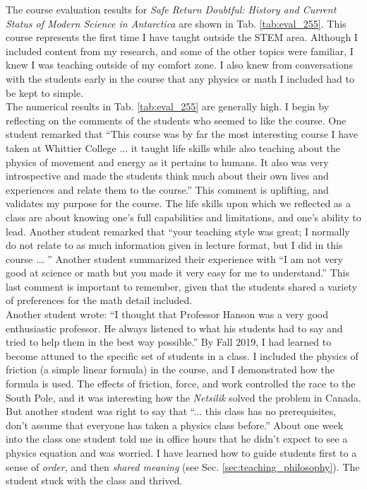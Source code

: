 \documentclass[../../../main.tex]{subfiles}
\begin{document}
The course evaluation results for \textit{Safe Return Doubtful: History and Current Status of Modern Science in Antarctica} are shown in Tab. \ref{tab:eval_255}.  This course represents the first time I have taught  outside the STEM area.  Although I included content from my research, and some of the other topics were familiar, I knew I was teaching outside of my comfort zone.  I also knew from conversations with the students early in the course that any physics or math I included had to be kept to simple.
\\
\vspace{0.25cm}
The numerical results in Tab. \ref{tab:eval_255} are generally high.  I begin by reflecting on the comments of the students who seemed to like the course.  One student remarked that ``This course was by far the most interesting course I have taken at Whittier College ... it taught life skills while also teaching about the physics of movement and energy as it pertains to humans.  It also was very introspective and made the students think much about their own lives and experiences and relate them to the course.''  This comment is uplifting, and validates my purpose for the course.  The life skills upon which we reflected as a class are about knowing one's full capabilities and limitations, and one's ability to lead.  Another student remarked that ``your teaching style was great; I normally do not relate to as much information given in lecture format, but I did in this course ... ''  Another student summarized their experience with ``I am not very good at science or math but you made it very easy for me to understand.''  This last comment is important to remember, given that the students shared a variety of preferences for the math detail included.
\\
\vspace{0.25cm}
Another student wrote: ``I thought that Professor Hanson was a very good enthusiastic professor. He always listened to what his students had to say and tried to help them in the best way possible.'' By Fall 2019, I had learned to become attuned to the specific set of students in a class.  I included the physics of friction (a simple linear formula) in the course, and I demonstrated how the formula is used.  The effects of friction, force, and work controlled the race to the South Pole, and it was interesting how the \textit{Netsilik} solved the problem in Canada.  But another student was right to say that ``... this class has no prerequisites, don't assume that everyone has taken a physics class before.''  About one week into the class one student told me in office hours that he didn't expect to see a physics equation and was worried.  I have learned how to guide students first to a sense of \textit{order}, and then \textit{shared meaning} (see Sec. \ref{sec:teaching_philosophy}).  The student stuck with the class and thrived.
\end{document}
